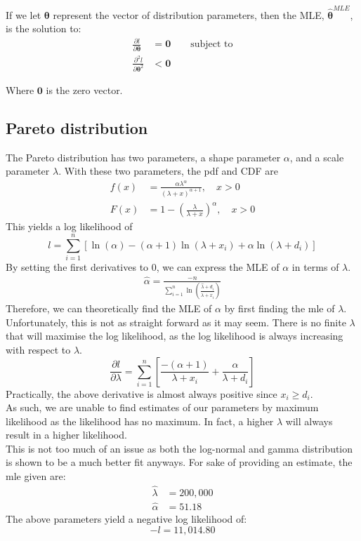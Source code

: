 \documentclass{article}
\begin{document}
	If we let $\bm\theta$ represent the vector of distribution parameters, then the MLE, $\bm{\hat{\theta}}^{MLE}$, is the solution to:
	\begin{align*}
		\frac{\partial l}{\partial \bm{\theta}} &= \bm{0} \qquad \text{subject to}\\
		\frac{\partial ^2 l}{\partial \bm{\theta}^2} &< \bm{0}
	\end{align*}

	Where $\bm 0$ is the zero vector.
	
	\subsection{Pareto distribution}
	The Pareto distribution has two parameters, a shape parameter $ \alpha $, and a scale parameter $ \lambda $. With these two parameters, the pdf and CDF are 
	\begin{align*}
		f(x) &= \frac{\alpha \lambda^\alpha}{(\lambda+x)^{\alpha + 1}}, \quad x > 0\\
		F(x) &= 1-\left(\frac{\lambda}{\lambda + x}\right)^\alpha, \quad x > 0
	\end{align*}
	This yields a log likelihood of
	$$ l=\sum_{i=1}^{n}\left[\ln(\alpha) - (\alpha + 1)\ln(\lambda + x_i) + \alpha\ln(\lambda+d_i)\right]$$
	By setting the first derivatives to 0, we can express the MLE of $\alpha$ in terms of $\lambda$.
	\begin{align}
	\hat{\alpha} = \frac{-n}{\sum_{i=1}^{n}\ln\left(\frac{\hat{\lambda} + d_i}{\hat{\lambda}+x_i}\right)} \label{pareto_dl_da}
	\end{align}
	Therefore, we can theoretically find the MLE of $\alpha$ by first finding the mle of $\lambda$. Unfortunately, this is not as straight forward as it may seem. There is no finite $\lambda$ that will maximise the log likelihood, as the log likelihood is always increasing with respect to $\lambda$.
	$$\frac{\partial l}{\partial\lambda}=\sum_{i=1}^{n}\left[\frac{-(\alpha+1)}{\lambda+x_i}+\frac{\alpha}{\lambda+d_i}\right]$$
	Practically, the above derivative is almost always positive since $x_i \geq d_i$.\\
	As such, we are unable to find estimates of our parameters by maximum likelihood as the likelihood has no maximum. In fact, a higher $\lambda$ will always result in a higher likelihood.\\
	This is not too much of an issue as both the log-normal and gamma distribution is shown to be a much better fit anyways. For sake of providing an estimate, the mle given are:
	\begin{align*}
		\hat{\lambda} &= 200,000\\
		\hat{\alpha} &= 51.18
	\end{align*}
	The above parameters yield a negative log likelihood of:
	$$-l = 11,014.80$$
	
\end{document}
